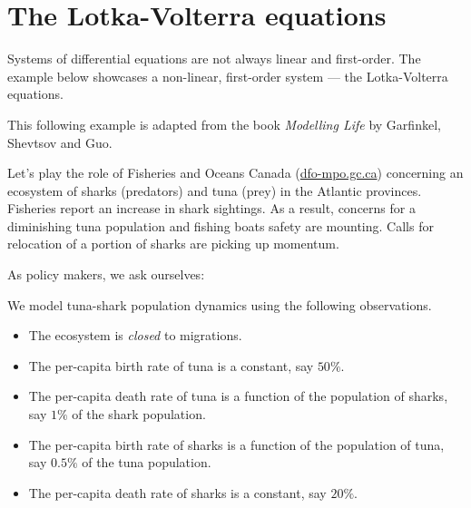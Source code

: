 \documentclass[../main.tex]{subfiles}
\begin{document}
 \section{The Lotka-Volterra equations}

Systems of differential equations  are not always linear and first-order. The example below showcases a non-linear, first-order system --- the Lotka-Volterra  equations.

This following example is adapted from the book \emph{Modelling Life} by Garfinkel, Shevtsov and Guo.

\begin{example} \label{ex:lotka-volterra-sharks}
  Let's play the role of Fisheries and Oceans Canada (\href{https://www.dfo-mpo.gc.ca}{\ttfamily dfo-mpo.gc.ca}) concerning an ecosystem of sharks (predators) and tuna (prey)  in the Atlantic provinces.  Fisheries report an increase in shark sightings.  As a result, concerns for a diminishing tuna population and fishing boats safety are mounting.  Calls for relocation of a portion of sharks are picking up momentum. 

  As policy makers, we ask ourselves:  %

  \medskip

  We model tuna-shark population dynamics using the following observations.
  \begin{itemize}
    \item The ecosystem is \emph{closed} to migrations.
    \item The per-capita birth rate of tuna is a constant, say \(50\%\).
    \item The per-capita death rate of tuna is a function of the population of sharks, say \(1\%\) of the shark population. 
    \item The per-capita birth rate of sharks is a function of the population of tuna, say \(0.5\%\) of the tuna population.
    \item The per-capita death rate of sharks is a constant, say \(20\%\).
  \end{itemize}


\end{example}
\end{document}
